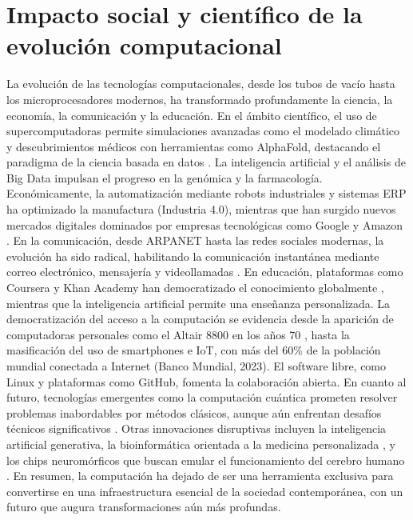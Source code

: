 \documentclass[]{article}
\begin{document}
\section*{Impacto social y científico de la evolución computacional}
La evolución de las tecnologías computacionales, desde los tubos de vacío hasta los microprocesadores modernos, ha transformado profundamente la ciencia, la economía, la comunicación y la educación. En el ámbito científico, el uso de supercomputadoras permite simulaciones avanzadas como el modelado climático y descubrimientos médicos con herramientas como AlphaFold, destacando el paradigma de la ciencia basada en datos \cite{hey2009fourth}. La inteligencia artificial y el análisis de Big Data impulsan el progreso en la genómica y la farmacología. Económicamente, la automatización mediante robots industriales y sistemas ERP ha optimizado la manufactura (Industria 4.0), mientras que han surgido nuevos mercados digitales dominados por empresas tecnológicas como Google y Amazon \cite{brynjolfsson2014second}. En la comunicación, desde ARPANET hasta las redes sociales modernas, la evolución ha sido radical, habilitando la comunicación instantánea mediante correo electrónico, mensajería y videollamadas \cite{hafner1996wizards}. En educación, plataformas como Coursera y Khan Academy han democratizado el conocimiento globalmente \cite{bonk2009world}, mientras que la inteligencia artificial permite una enseñanza personalizada. La democratización del acceso a la computación se evidencia desde la aparición de computadoras personales como el Altair 8800 en los años 70 \cite{freiberger1984fire}, hasta la masificación del uso de smartphones e IoT, con más del 60\% de la población mundial conectada a Internet (Banco Mundial, 2023). El software libre, como Linux y plataformas como GitHub, fomenta la colaboración abierta. En cuanto al futuro, tecnologías emergentes como la computación cuántica prometen resolver problemas inabordables por métodos clásicos, aunque aún enfrentan desafíos técnicos significativos \cite{bernhardt2019quantum}. Otras innovaciones disruptivas incluyen la inteligencia artificial generativa, la bioinformática orientada a la medicina personalizada \cite{mukherjee2016gene}, y los chips neuromórficos que buscan emular el funcionamiento del cerebro humano \cite{kurzweil2012mind}. En resumen, la computación ha dejado de ser una herramienta exclusiva para convertirse en una infraestructura esencial de la sociedad contemporánea, con un futuro que augura transformaciones aún más profundas.
\end{document}
